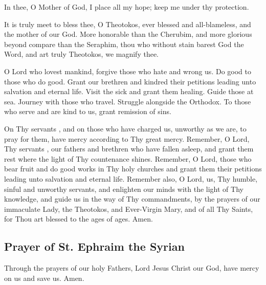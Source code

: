 In thee, O Mother of God, I place all my hope; keep me under thy protection.

It is truly meet to bless thee, O Theotokos, ever blessed and all-blameless, and the mother of our God. More honorable than the Cherubim, and more glorious beyond compare than the Seraphim, thou who without stain barest God the Word, and art truly Theotokos, we magnify thee.

O Lord who lovest mankind, forgive those who hate and wrong us. Do good to those who do good. Grant our brethren and kindred their petitions leading unto salvation and eternal life. Visit the sick and grant them healing. Guide those at sea. Journey with those who travel. Struggle alongside the Orthodox. To those who serve and are kind to us, grant remission of sins.

On Thy servants , and on those who have charged us, unworthy as we are, to pray for them, have mercy according to Thy great mercy. Remember, O Lord, Thy servants , our fathers and brethren who have fallen asleep, and grant them rest where the light of Thy countenance shines. Remember, O Lord, those who bear fruit and do good works in Thy holy churches and grant them their petitions leading unto salvation and eternal life. Remember also, O Lord, us, Thy humble, sinful and unworthy servants, and enlighten our minds with the light of Thy knowledge, and guide us in the way of Thy commandments, by the prayers of our immaculate Lady, the Theotokos, and Ever-Virgin Mary, and of all Thy Saints, for Thou art blessed to the ages of ages. Amen. 

\subsection{Prayer of St. Ephraim the Syrian}





Through the prayers of our holy Fathers, Lord Jesus Christ our God, have mercy on us and save us. Amen.

\cleardoublepage
